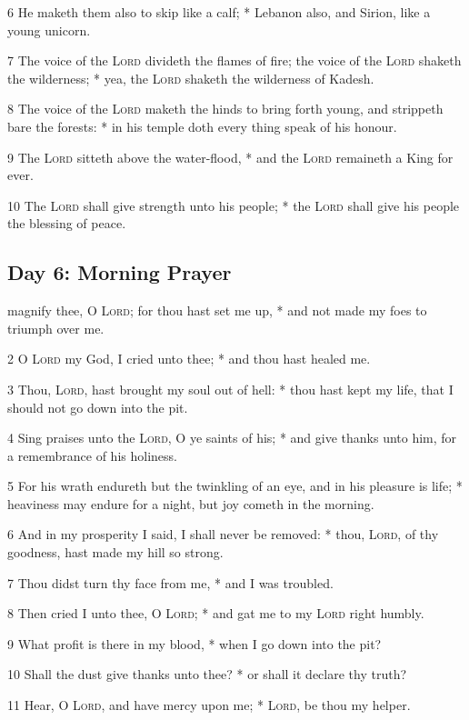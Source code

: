 6 He maketh them also to skip like a calf; * Lebanon also, and Sirion, like a young unicorn.\par
7 The voice of the {\textsc{Lord}} divideth the flames of fire; the voice of the {\textsc{Lord}} shaketh the wilderness; * yea, the {\textsc{Lord}} shaketh the wilderness of Kadesh.\par
8 The voice of the {\textsc{Lord}} maketh the hinds to bring forth young, and strippeth bare the forests: * in his temple doth every thing speak of his honour.\par
9 The {\textsc{Lord}} sitteth above the water-flood, * and the {\textsc{Lord}} remaineth a King for ever.\par
10 The {\textsc{Lord}} shall give strength unto his people; * the {\textsc{Lord}} shall give his people the blessing of peace.
\subsection{Day 6: Morning Prayer}
 magnify thee, O {\textsc{Lord}}; for thou hast set me up, * and not made my foes to triumph over me.\par
2 O {\textsc{Lord}} my God, I cried unto thee; * and thou hast healed me.\par
3 Thou, {\textsc{Lord}}, hast brought my soul out of hell: * thou hast kept my life, that I should not go down into the pit.\par
4 Sing praises unto the {\textsc{Lord}}, O ye saints of his; * and give thanks unto him, for a remembrance of his holiness.\par
5 For his wrath endureth but the twinkling of an eye, and in his pleasure is life; * heaviness may endure for a night, but joy cometh in the morning.\par
6 And in my prosperity I said, I shall never be removed: * thou, {\textsc{Lord}}, of thy goodness, hast made my hill so strong.\par
7 Thou didst turn thy face from me, * and I was troubled.\par
8 Then cried I unto thee, O {\textsc{Lord}}; * and gat me to my {\textsc{Lord}} right humbly.\par
9 What profit is there in my blood, * when I go down into the pit?\par
10 Shall the dust give thanks unto thee? * or shall it declare thy truth?\par
11 Hear, O {\textsc{Lord}}, and have mercy upon me; * {\textsc{Lord}}, be thou my helper.\par
